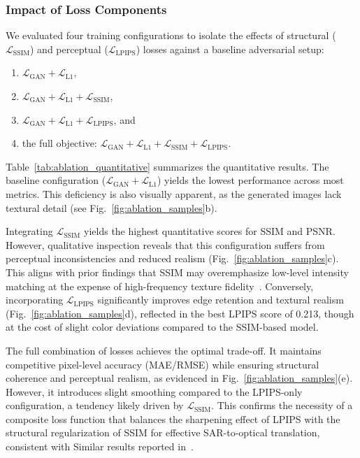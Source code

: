 \documentclass[remotesensing,article,submit,pdftex,moreauthors]{Definitions/mdpi}
\begin{document}
\subsubsection{Impact of Loss Components}
\label{subsec:ablation_loss}

We evaluated four training configurations to isolate the effects of structural ($\mathcal{L}_{\text{SSIM}}$) and perceptual ($\mathcal{L}_{\text{LPIPS}}$) losses against a baseline adversarial setup:
\begin{enumerate}
    \item $\mathcal{L}_{\text{GAN}} + \mathcal{L}_{\text{L1}}$,
    \item $\mathcal{L}_{\text{GAN}} + \mathcal{L}_{\text{L1}} + \mathcal{L}_{\text{SSIM}}$,
    \item $\mathcal{L}_{\text{GAN}} + \mathcal{L}_{\text{L1}} + \mathcal{L}_{\text{LPIPS}}$, and
    \item the full objective: $\mathcal{L}_{\text{GAN}} + \mathcal{L}_{\text{L1}} + \mathcal{L}_{\text{SSIM}} + \mathcal{L}_{\text{LPIPS}}$.
\end{enumerate}

Table~\ref{tab:ablation_quantitative} summarizes the quantitative results. The baseline configuration ($\mathcal{L}_{\text{GAN}} + \mathcal{L}_{\text{L1}}$) yields the lowest performance across most metrics. This deficiency is also visually apparent, as the generated images lack textural detail (see Fig.~\ref{fig:ablation_samples}b).

Integrating $\mathcal{L}_{\text{SSIM}}$ yields the highest quantitative scores for SSIM and PSNR. However, qualitative inspection reveals that this configuration suffers from perceptual inconsistencies and reduced realism (Fig.~\ref{fig:ablation_samples}c). This aligns with prior findings that SSIM may overemphasize low-level intensity matching at the expense of high-frequency texture fidelity~\cite{nvidia_Understanding_SSIM}. Conversely, incorporating $\mathcal{L}_{\text{LPIPS}}$ significantly improves edge retention and textural realism (Fig.~\ref{fig:ablation_samples}d), reflected in the best LPIPS score of 0.213, though at the cost of slight color deviations compared to the SSIM-based model.

The full combination of losses achieves the optimal trade-off. It maintains competitive pixel-level accuracy (MAE/RMSE) while ensuring structural coherence and perceptual realism, as evidenced in Fig.~\ref{fig:ablation_samples}(e). However, it introduces slight smoothing compared to the LPIPS-only configuration, a tendency likely driven by $\mathcal{L}_{\text{SSIM}}$. This confirms the necessity of a composite loss function that balances the sharpening effect of LPIPS with the structural regularization of SSIM for effective SAR-to-optical translation, consistent with Similar results reported in~\cite{s2o_ViT_cGAN, CR_RS_GAN_s2o}.
\end{document}
